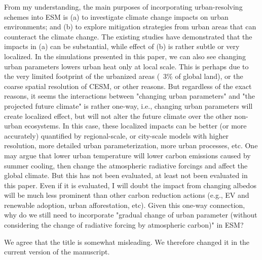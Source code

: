 \documentclass[12pt,american]{scrartcl}
\begin{document}
\begin{revcomment}
	From my understanding, the main purposes of incorporating urban-resolving schemes into ESM is (a) to investigate climate change impacts on urban environments; and (b) to explore mitigation strategies from urban areas that can counteract the climate change. The existing studies have demonstrated that the impacts in (a) can be substantial, while effect of (b) is rather subtle or very localized. In the simulations presented in this paper, we can also see changing urban parameters lowers urban heat only at local scale. This is perhaps due to the very limited footprint of the urbanized areas (~3\% of global land), or the coarse spatial resolution of CESM, or other reasons. But regardless of the exact reasons, it seems the interactions between "changing urban parameters" and "the projected future climate" is rather one-way, i.e., changing urban parameters will create localized effect, but will not alter the future climate over the other non-urban ecosystems. In this case, these localized impacts can be better (or more accurately) quantified by regional-scale, or city-scale models with higher resolution, more detailed urban parameterization, more urban processes, etc. One may argue that lower urban temperature will lower carbon emissions caused by summer cooling, then change the atmospheric radiative forcings and affect the global climate. But this has not been evaluated, at least not been evaluated in this paper. Even if it is evaluated, I will doubt the impact from changing albedos will be much less prominent than other carbon reduction actions (e.g., EV and renewable adoption, urban afforestation, etc). Given this one-way connection, why do we still need to incorporate "gradual change of urban parameter (without considering the change of radiative forcing by atmospheric carbon)" in ESM?
\end{revcomment}
\begin{revresponse}
	We agree that the title is somewhat misleading.
	We therefore changed it in the current version of the manuscript.
\end{revresponse}
\end{document}
